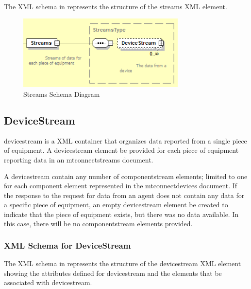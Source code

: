 The XML schema in  represents the structure of the \gls{streams} XML element.   

\begin{figure}[ht]
  \centering
  \includegraphics[width=0.75\textwidth]{figures/streams-schema-diagram.png}
  \caption{Streams Schema Diagram}
  \label{fig:streams-schema-diagram}
\end{figure}

\FloatBarrier



\pagebreak

\subsection{DeviceStream}\label{sec:DeviceStream}

\gls{devicestream} is a XML container that organizes data reported from a single piece of equipment.  A \gls{devicestream} element \must be provided for each piece of equipment reporting data in an \gls{mtconnectstreams} document.

A \gls{devicestream} \may contain any number of \gls{componentstream} elements; limited to one for each component element represented in the \gls{mtconnectdevices} document.  If the response to the request for data from an \gls{agent} does not contain any data for a specific piece of equipment, an empty \gls{devicestream} element \may be created to indicate that the piece of equipment exists, but there was no data available.  In this case, there will be no \gls{componentstream} elements provided. 



\subsubsection{XML Schema for DeviceStream}

The XML schema in  represents the structure of the \gls{devicestream} XML element showing the attributes defined for \gls{devicestream} and the elements that \may be associated with \gls{devicestream}.

